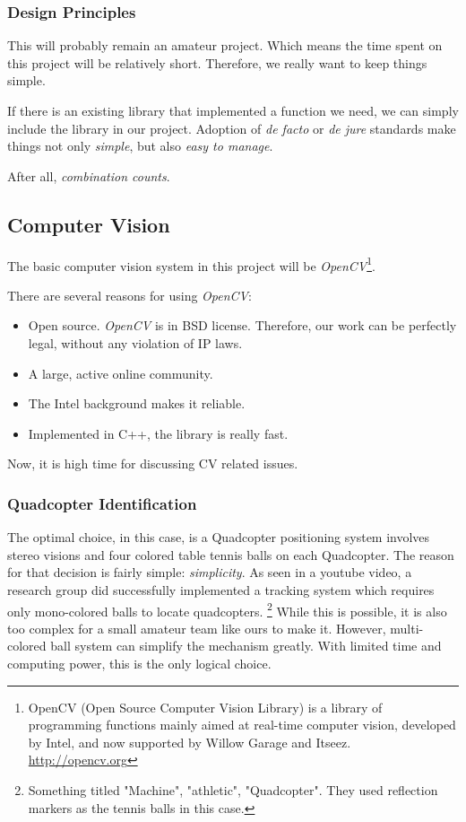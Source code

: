 \subsubsection{Design Principles}

This will probably remain an amateur project. Which means the time spent on this project will be relatively short. Therefore, we really want to keep things simple.

If there is an existing library that implemented a function we need, we can simply include the library in our project. Adoption of \emph{de facto} or \emph{de jure} standards make things not only \emph{simple}, but also \emph{easy to manage}.

After all, \emph{combination counts}.

\subsection{Computer Vision}
The basic computer vision system in this project will be \emph{OpenCV}\footnote{ OpenCV (Open Source Computer Vision Library) is a library of programming functions mainly aimed at real-time computer vision, developed by Intel, and now supported by Willow Garage and Itseez. \url{http://opencv.org}}.

There are several reasons for using \emph{OpenCV}:
\begin{itemize}
  \item Open source. \emph{OpenCV} is in BSD license. Therefore, our work can be perfectly legal, without any violation of IP laws.
  \item A large, active online community.
  \item The Intel background makes it reliable.
  \item Implemented in C++, the library is really fast.
\end{itemize}
Now, it is high time for discussing CV related issues.
\subsubsection{Quadcopter Identification}
The optimal choice, in this case, is a Quadcopter positioning system involves stereo visions and four colored table tennis balls on each Quadcopter.
The reason for that decision is fairly simple: \emph{simplicity}.
As seen in a youtube video, a research group did successfully implemented a tracking system which requires only mono-colored balls to locate quadcopters. \footnote{Something titled "Machine", "athletic", "Quadcopter". They used reflection markers as the tennis balls in this case.} While this is possible, it is also too complex for a small amateur team like ours to make it. However, multi-colored ball system can simplify the mechanism greatly. With limited time and computing power, this is the only logical choice.
